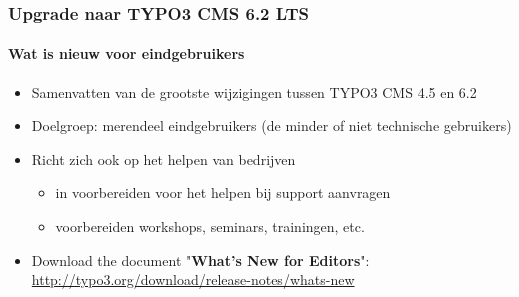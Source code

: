 \begin{frame}[fragile]
	\frametitle{Upgrade naar TYPO3 CMS 6.2 LTS}
	\framesubtitle{Wat is nieuw voor eindgebruikers}

	\begin{itemize}
		\item Samenvatten van de grootste wijzigingen tussen TYPO3 CMS 4.5 en 6.2 
		\item Doelgroep: merendeel eindgebruikers (de minder of niet technische gebruikers)
		\item Richt zich ook op het helpen van bedrijven

			\begin{itemize}
				\item in voorbereiden voor het helpen bij support aanvragen
				\item voorbereiden workshops, seminars, trainingen, etc. 
			\end{itemize}

		\item Download the document "\textbf{What's New for Editors}":\newline
			\smaller\url{http://typo3.org/download/release-notes/whats-new}\normalsize

	\end{itemize}

\end{frame}



